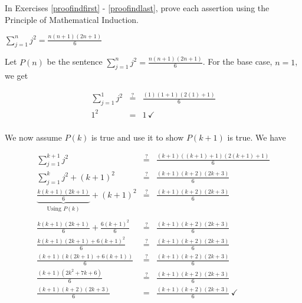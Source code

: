 \documentclass{ximera}
\begin{document}
	\author{Stitz-Zeager}


\begin{question}

    In Exercises \ref{proofindfirst} - \ref{proofindlast}, prove each assertion using the Principle of Mathematical Induction.

\begin{problem}\label{proofindfirst}
    $\displaystyle{ \sum_{j=1}^{n} j^2 = \frac{n(n+1)(2n+1)}{6}}$

\begin{solution}
Let $P(n)$ be the sentence $\displaystyle{ \sum_{j=1}^{n} j^2 = \frac{n(n+1)(2n+1)}{6}}$. For the base case, $n=1$, we get

\[ \begin{array}{rcl} 

\displaystyle{ \sum_{j=1}^{1} j^2} & \stackrel{?}{=} &  \frac{(1)(1+1)(2(1)+1)}{6} \\  
 1^2  & = & 1 \, \checkmark \\ \end{array} \]


We now assume $P(k)$ is true and use it to show $P(k+1)$ is true.  We have


\[ \begin{array}{rcl} 

\displaystyle{ \sum_{j=1}^{k+1} j^2} & \stackrel{?}{=} &  \frac{(k+1)((k+1)+1)(2(k+1)+1)}{6} \\  
\displaystyle{ \sum_{j=1}^{k} j^2}  + (k+1)^2 &  \stackrel{?}{=}  & \frac{(k+1)(k+2)(2k+3)}{6} \\  
\underbrace{\frac{k(k+1)(2k+1)}{6}}_{\text{Using $P(k)$}} + (k+1)^2 &  \stackrel{?}{=}  & \frac{(k+1)(k+2)(2k+3)}{6}  \\ 

&& \\

\frac{k(k+1)(2k+1)}{6} + \frac{6(k+1)^2}{6} &  \stackrel{?}{=}  & \frac{(k+1)(k+2)(2k+3)}{6}  \\  
\frac{k(k+1)(2k+1)+6(k+1)^2}{6} &  \stackrel{?}{=}  & \frac{(k+1)(k+2)(2k+3)}{6}  \\  
\frac{(k+1)(k(2k+1)+6(k+1))}{6} &  \stackrel{?}{=}  & \frac{(k+1)(k+2)(2k+3)}{6}  \\  
\frac{(k+1)\left(2k^2+7k+6\right)}{6} &  \stackrel{?}{=}  & \frac{(k+1)(k+2)(2k+3)}{6}  \\  
\frac{(k+1)(k+2)(2k+3)}{6} & = & \frac{(k+1)(k+2)(2k+3)}{6}  \, \checkmark \\  
 \end{array} \]
 

\end{solution}
\end{problem}
\end{question}
\end{document}
